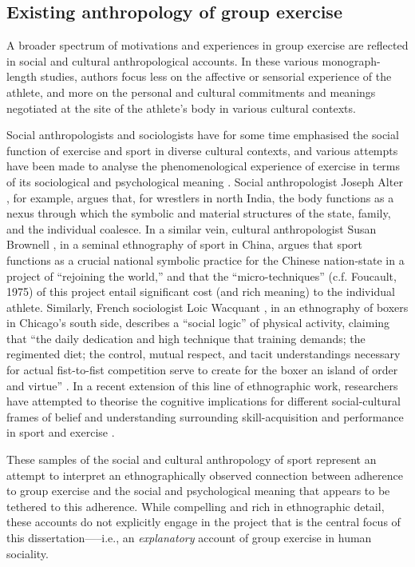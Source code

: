 \begin{CJK}{UTF8}{gbsn}
\subsection{Existing anthropology of group exercise}
A broader spectrum of motivations and experiences in group exercise are reflected in social and cultural anthropological accounts.  In these various monograph-length studies, authors focus less on the affective or sensorial experience of the athlete, and more on the personal and cultural commitments and meanings negotiated at the site of the athlete’s body in various cultural contexts.

Social anthropologists and sociologists have for some time emphasised the social function of exercise and sport in diverse cultural contexts, and various attempts have been made to analyse the phenomenological experience of exercise in terms of its sociological and psychological meaning \citep{Bourdieu1978}.  Social anthropologist Joseph Alter \textcite{Alter1993}, for example, argues that, for wrestlers in north India, the body functions as a nexus through which the symbolic and material structures of the state, family, and the individual coalesce.  In a similar vein, cultural anthropologist Susan Brownell \textcite{Bronwell1995}, in a seminal ethnography of sport in China, argues that sport functions as a crucial national symbolic practice for the Chinese nation-state in a project of ``rejoining the world,'' and that the ``micro-techniques'' (c.f. Foucault, 1975) of this project entail significant cost (and rich meaning) to the individual athlete.   Similarly, French sociologist Loic Wacquant \textcite{Wacquant2004}, in an ethnography of boxers in Chicago’s south side, describes a ``social logic'' of physical activity, claiming that ``the daily dedication and high technique that training demands; the regimented diet; the control, mutual respect, and tacit understandings necessary for actual fist-to-fist competition serve to create for the boxer an island of order and virtue'' \textcite[17]{Wacquant2004}.  In a recent extension of this line of ethnographic work, researchers have attempted to theorise the cognitive implications for different social-cultural frames of belief and understanding surrounding skill-acquisition and performance in sport and exercise \citep{Downey2005bDowney2007,Marchand2010}.

These samples of the social and cultural anthropology of sport represent an attempt to interpret an ethnographically observed connection between adherence to group exercise and the social and psychological meaning that appears to be tethered to this adherence.  While compelling and rich in ethnographic detail, these accounts do not explicitly engage in the project that is the central focus of this dissertation—--i.e., an \textit{explanatory} account of group exercise in human sociality.



\end{CJK}
